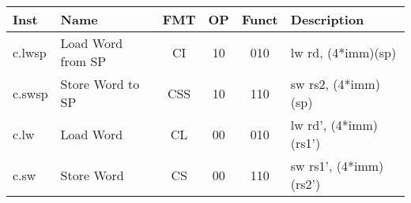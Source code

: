 \begin{center}
\begin{tabular}
{T | l | c | c | c | T } \hline
\rm Inst   & Name                    & FMT & \rm OP & \rm Funct & \rm Description          \\ \hline
c.lwsp     & Load Word from SP       & CI  & 10     & 010       & lw rd, (4*imm)(sp)       \\
c.swsp     & Store Word to SP        & CSS & 10     & 110       & sw rs2, (4*imm)(sp)      \\
c.lw       & Load Word               & CL  & 00     & 010       & lw rd', (4*imm)(rs1')    \\
c.sw       & Store Word              & CS  & 00     & 110       & sw rs1', (4*imm)(rs2')    \\

\end{tabular}
\end{center}
